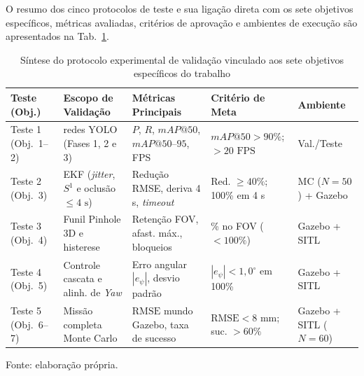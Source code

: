 O resumo dos cinco protocolos de teste e sua ligação direta com os sete objetivos específicos, métricas avaliadas, critérios de aprovação e ambientes de execução são apresentados na Tab.~\ref{tab:protocolo_testes_tcc}.

\begin{table}[H]
	\centering
	\footnotesize
	\setlength{\tabcolsep}{3pt}
	\captionsetup{justification=centering}
	\caption{Síntese do protocolo experimental de validação vinculado aos sete objetivos específicos do trabalho}
	\label{tab:protocolo_testes_tcc}
	\vspace{0.2cm}
	\begin{tabular}{>{\raggedright\arraybackslash}p{2.3cm}>{\raggedright\arraybackslash}p{3.6cm}>{\raggedright\arraybackslash}p{3.6cm}>{\raggedright\arraybackslash}p{3.0cm}>{\raggedright\arraybackslash}p{2.4cm}}
		\hline
		\textbf{Teste (Obj.)} & \textbf{Escopo de Validação} & \textbf{Métricas Principais} & \textbf{Critério de Meta} & \textbf{Ambiente} \\
		\hline
		Teste 1 (Obj.~1--2) & 4 redes YOLO (Fases 1, 2 e 3) & $P$, $R$, $mAP@50$, $mAP@50\text{--}95$, FPS & $mAP@50 > 90\%$; $> 20\text{ FPS}$ & Val./Teste \\
		Teste 2 (Obj.~3) & EKF (\textit{jitter}, $S^1$ e oclusão $\le 4\text{ s}$) & Redução RMSE, deriva 4 s, \textit{timeout} & Red. $\ge 40\%$; 100\% em 4 s & MC ($N=50$) + Gazebo \\
		Teste 3 (Obj.~4) & Funil Pinhole 3D e histerese & Retenção FOV, afast. máx., bloqueios & 100\% no FOV ($< 100\%$) & Gazebo + SITL \\
		Teste 4 (Obj.~5) & Controle cascata e alinh. de \textit{Yaw} & Erro angular $|e_\psi|$, desvio padrão & $|e_\psi| < 1,0^\circ$ em 100\% & Gazebo + SITL \\
		Teste 5 (Obj.~6--7) & Missão completa Monte Carlo & $\text{RMSE}$ mundo Gazebo, taxa de sucesso & $\text{RMSE} < 8\text{ mm}$; suc. $> 60\%$ & Gazebo + SITL ($N=60$) \\
		\hline
	\end{tabular}
	\vspace{0.2cm}
	\begin{flushleft}
		\footnotesize Fonte: elaboração própria.
	\end{flushleft}
\end{table}